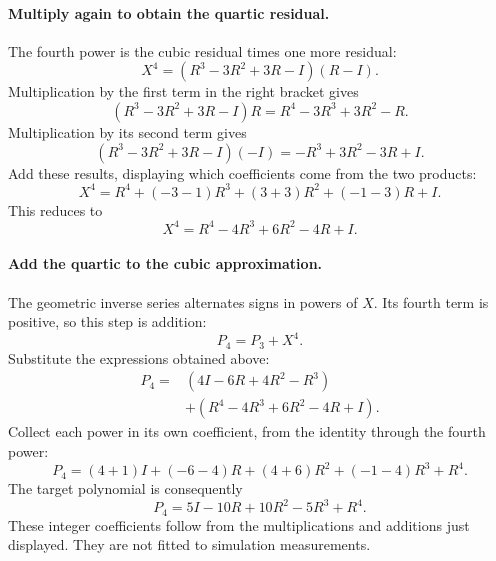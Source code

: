 \documentclass[11pt]{article}
\begin{document}
\paragraph{Multiply again to obtain the quartic residual.}
The fourth power is the cubic residual times one more residual:
\begin{equation}
 X^4=(R^3-3R^2+3R-I)(R-I).
\end{equation}
Multiplication by the first term in the right bracket gives
\begin{equation}
 (R^3-3R^2+3R-I)R=R^4-3R^3+3R^2-R.
\end{equation}
Multiplication by its second term gives
\begin{equation}
 (R^3-3R^2+3R-I)(-I)=-R^3+3R^2-3R+I.
\end{equation}
Add these results, displaying which coefficients come from the two products:
\begin{equation}
 X^4=R^4+(-3-1)R^3+(3+3)R^2+(-1-3)R+I.
\end{equation}
This reduces to
\begin{equation}
 X^4=R^4-4R^3+6R^2-4R+I.
\end{equation}

\paragraph{Add the quartic to the cubic approximation.}
The geometric inverse series alternates signs in powers of $X$. Its
fourth term is positive, so this step is addition:
\begin{equation}
 P_4=P_3+X^4.
\end{equation}
Substitute the expressions obtained above:
\begin{equation}
 \begin{split}
 P_4={}&(4I-6R+4R^2-R^3)\\
       &+(R^4-4R^3+6R^2-4R+I).
 \end{split}
\end{equation}
Collect each power in its own coefficient, from the identity through the
fourth power:
\begin{equation}
 P_4=(4+1)I+(-6-4)R+(4+6)R^2+(-1-4)R^3+R^4.
\end{equation}
The target polynomial is consequently
\begin{equation}
 P_4=5I-10R+10R^2-5R^3+R^4.
 \label{eq:fourth-target}
\end{equation}
These integer coefficients follow from the multiplications and additions
just displayed. They are not fitted to simulation measurements.
\end{document}
